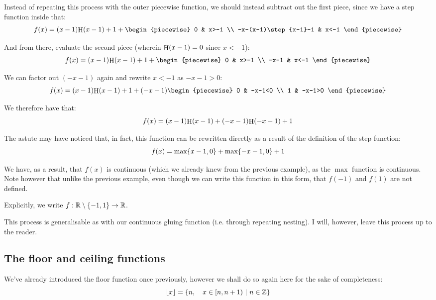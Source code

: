 \begin{example}
    Instead of repeating this process with the outer piecewise function, we should instead subtract out the first piece, since we have a step function inside that:
    $$
        f(x) = (x-1)\step{x-1}+1+\begin{piecewise}
            0 & x>-1 \\
            -x-(x-1)\step{x-1}-1 & x<-1
        \end{piecewise}
    $$

    And from there, evaluate the second piece (wherein $\step{x-1}=0$ since $x<-1$):
    $$
        f(x) = (x-1)\step{x-1}+1+\begin{piecewise}
            0 & x>-1 \\
            -x-1 & x<-1
        \end{piecewise}
    $$

    We can factor out $(-x-1)$ again and rewrite $x<-1$ as $-x-1>0$:
    $$
        f(x) = (x-1)\step{x-1}+1+(-x-1)\begin{piecewise}
            0 & -x-1<0 \\
            1 & -x-1>0
        \end{piecewise}
    $$
    \addtocounter{example}{-1}

    We therefore have that:
    $$
        f(x) = (x-1)\step{x-1}+(-x-1)\step{-x-1}+1
    $$

    The astute may have noticed that, in fact, this function can be rewritten directly as a result of the definition of the step function:
    $$
        f(x) = \max\{x-1,0\}+\max\{-x-1,0\}+1
    $$

    We have, as a result, that $f(x)$ is continuous (which we already knew from the previous example), as the $\max$ function is continuous. Note however that unlike the previous example, even though we can write this function in this form, that $f(-1)$ and $f(1)$ are not defined.

    Explicitly, we write $f:\mathbb{R}\setminus\{-1,1\}\to\mathbb{R}$.
\end{example}

This process is generalisable as with our continuous gluing function (i.e. through repeating nesting). I will, however, leave this process up to the reader.

\subsection{The floor and ceiling functions}
We've already introduced the floor function once previously, however we shall do so again here for the sake of completeness:
$$
\lfloor x\rfloor=\left\{n,\quad x\in[n,n+1)\ \middle|\ n\in\mathbb{Z}\right\}
$$

